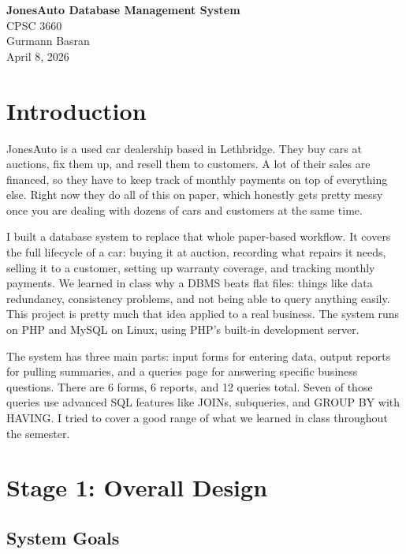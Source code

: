 \documentclass[12pt]{article}
\begin{document}
\begin{center}
{\Large \textbf{JonesAuto Database Management System}}\\[0.4cm]
CPSC 3660\\[0.3cm]
Gurmann Basran\\[0.3cm]
April 8, 2026
\end{center}
\vspace{0.5cm}

\section{Introduction}

JonesAuto is a used car dealership based in Lethbridge. They buy cars at auctions, fix them up, and resell them to customers. A lot of their sales are financed, so they have to keep track of monthly payments on top of everything else. Right now they do all of this on paper, which honestly gets pretty messy once you are dealing with dozens of cars and customers at the same time.

I built a database system to replace that whole paper-based workflow. It covers the full lifecycle of a car: buying it at auction, recording what repairs it needs, selling it to a customer, setting up warranty coverage, and tracking monthly payments. We learned in class why a DBMS beats flat files: things like data redundancy, consistency problems, and not being able to query anything easily. This project is pretty much that idea applied to a real business. The system runs on PHP and MySQL on Linux, using PHP's built-in development server.

The system has three main parts: input forms for entering data, output reports for pulling summaries, and a queries page for answering specific business questions. There are 6 forms, 6 reports, and 12 queries total. Seven of those queries use advanced SQL features like JOINs, subqueries, and GROUP BY with HAVING. I tried to cover a good range of what we learned in class throughout the semester.

\section{Stage 1: Overall Design}

\subsection{System Goals}
\end{document}

